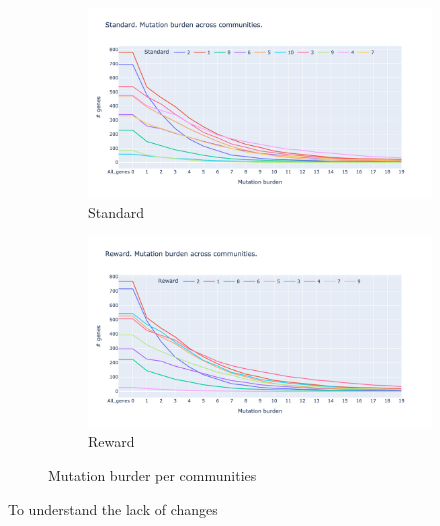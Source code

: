 \begin{figure}[!htb]
    \hfill
    \begin{subfigure}[b]{0.49\textwidth}
        \centering
        \includegraphics[width=\textwidth,keepaspectratio]{Sections/Network_I/Resources/P0/Comms/Mut_evo_Std_4k.png}
        \caption{Standard}
    \end{subfigure}
    \begin{subfigure}[b]{0.49\textwidth}
        \centering
        \includegraphics[width=\textwidth,keepaspectratio]{Sections/Network_I/Resources/P0/Comms/Mut_evo_Rwd_4k.png}
        \caption{Reward}
    \end{subfigure}
    \caption{Mutation burder per communities}
    \label{fig:N_I:p0_mut_burden}
\end{figure}



To understand the lack of changes



\newpage

